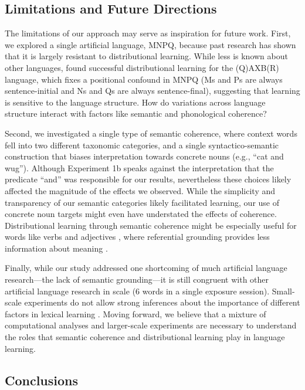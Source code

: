 \documentclass[man,floatsintext]{apa6}
\begin{document}
\subsection{Limitations and Future Directions}

The limitations of our approach may serve as inspiration for future work. First, we explored a single artificial language, MNPQ, because past research has shown that it is largely resistant to distributional learning. While less is known about other languages, \cite{reeder2009} found successful distributional learning for the (Q)AXB(R) language, which fixes a positional confound in MNPQ (Ms and Ps are always sentence-initial and Ns and Qs are always sentence-final), suggesting that learning is sensitive to the language structure. How do variations across language structure interact with factors like semantic and phonological coherence?

Second, we investigated a single type of semantic coherence, where context words fell into two different taxonomic categories, and a single syntactico-semantic construction that biases interpretation towards concrete nouns (e.g., ``cat and wug''). Although Experiment 1b speaks against the interpretation that the predicate ``and'' was responsible for our results, nevertheless these choices likely affected the magnitude of the effects we observed. While the simplicity and transparency of our semantic categories likely facilitated learning, our use of concrete noun targets might even have understated the effects of coherence. Distributional learning through semantic coherence might be especially useful for words like verbs and adjectives \citep{redington1998}, where referential grounding provides less information about meaning \citep{gleitman1990}.

Finally, while our study addressed one shortcoming of much artificial language research---the lack of semantic grounding---it is still congruent with other artificial language research in scale (6 words in a single exposure session). Small-scale experiments do not allow strong inferences about the importance of different factors in lexical learning \citep{romberg2010, frank2013}. Moving forward, we believe that a mixture of computational analyses and larger-scale experiments are necessary to understand the roles that semantic coherence and distributional learning play in language learning.

\subsection{Conclusions}
\end{document}
